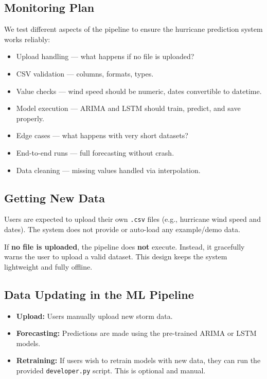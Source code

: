 \subsection{Monitoring Plan}
We test different aspects of the pipeline to ensure the hurricane prediction system works reliably:
\begin{itemize}
	\item Upload handling --- what happens if no file is uploaded?
	\item CSV validation --- columns, formats, types.
	\item Value checks --- wind speed should be numeric, dates convertible to datetime.
	\item Model execution --- ARIMA and LSTM should train, predict, and save properly.
	\item Edge cases --- what happens with very short datasets?
	\item End-to-end runs --- full forecasting without crash.
	\item Data cleaning --- missing values handled via interpolation.
\end{itemize}

\subsection{Getting New Data}
Users are expected to upload their own \texttt{.csv} files (e.g., hurricane wind speed and dates). The system does not provide or auto-load any example/demo data.

If \textbf{no file is uploaded}, the pipeline does \textbf{not} execute. Instead, it gracefully warns the user to upload a valid dataset. This design keeps the system lightweight and fully offline.

\subsection*{Data Updating in the ML Pipeline}
\begin{itemize}
	\item \textbf{Upload:} Users manually upload new storm data.
	\item \textbf{Forecasting:} Predictions are made using the pre-trained ARIMA or LSTM models.
	\item \textbf{Retraining:} If users wish to retrain models with new data, they can run the provided \texttt{developer.py} script. This is optional and manual.
\end{itemize}

